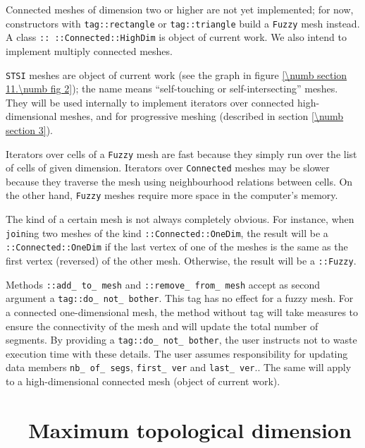 Connected meshes of dimension two or higher are not yet implemented; for now,
{\small\tt {}} constructors with {\small\tt \textcolor{tag}{tag}::rectangle} or
{\small\tt \textcolor{tag}{tag}::triangle} build a {\small\tt Fuzzy} mesh instead.
A class {\small\tt {}:: ::Connected::HighDim} is object of current work.
We also intend to implement multiply connected meshes.

{\small\tt STSI} meshes are object of current work (see the graph in figure
\ref{\numb section 11.\numb fig 2}); the name means ``self-touching or self-intersecting'' meshes.
They will be used internally to implement iterators over connected high-dimensional meshes,
and for progressive meshing (described in section \ref{\numb section 3}).

Iterators over cells of a {\small\tt Fuzzy} mesh are fast because they simply run over the
list of cells of given dimension.
Iterators over {\small\tt Connected} meshes may be slower because they traverse the mesh using
neighbourhood relations between cells.
On the other hand, {\small\tt Fuzzy} meshes require more space in the computer's memory.

The kind of a certain mesh is not always completely obvious.
For instance, when {\small\tt join}ing two meshes of the kind
{\small\tt {}::Connected::OneDim}, the result will be a
{\small\tt {}::Connected::OneDim} if the last vertex of one of the meshes
is the same as the first vertex (reversed) of the other mesh.
Otherwise, the result will be a {\small\tt {}::Fuzzy}.

Methods {\small\tt{}::add\_\,to\_\,mesh} and
{\small\tt{}::remove\_\,from\_\,mesh} accept as second argument a\break
{\small\tt\textcolor{tag}{tag}::do\_\,not\_\,bother}.
This tag has no effect for a fuzzy mesh.
For a connected one-dimensional mesh, the method without tag will take measures
to ensure the connectivity of the mesh and will update the total number of segments.
By providing a {\small\tt\textcolor{tag}{tag}::do\_\,not\_\,bother}, the user instructs
{\maniFEM} not to waste execution time with these details.
The user assumes responsibility for updating data members {\small\tt nb\_\,of\_\,segs},
{\small\tt first\_\,ver} and {\small\tt last\_\,ver}..
The same will apply to a high-dimensional connected mesh (object of current work).

\section{~~Maximum topological dimension}\label{\numb section 11.\numb parag 7}

